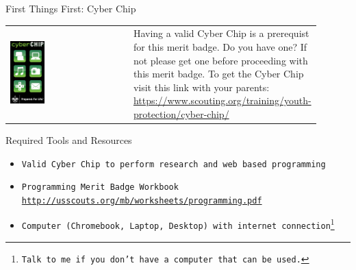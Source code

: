 \documentclass[10pt]{beamer}
\begin{document}
{\begin{frame}{First Things First: Cyber Chip}{ }
\begin{tabular}{m{0.4\linewidth}m{0.5\linewidth}}  
\includegraphics[width=0.3\textwidth]{img/cyberchip.png} & \cellcolor[gray]{0.8} Having a valid Cyber Chip is a prerequist for this merit badge.  Do you have one?  If not please get one before proceeding with this merit badge.
To get the Cyber Chip visit this link with your parents: {\footnotesize \url{https://www.scouting.org/training/youth-protection/cyber-chip/}}
\end{tabular} 
\vspace{1cm}

\end{frame}


\begin{frame}{Required Tools and Resources}{}
\begin{block}{}
  \begin{itemize}
    \item {\tt Valid Cyber Chip to perform research and web based programming}
    \item {\tt Programming Merit Badge Workbook \url{http://usscouts.org/mb/worksheets/programming.pdf}}
    \item {\tt Computer (Chromebook, Laptop, Desktop) with internet connection\footnote{Talk to me if you don't have a computer that can be used.}}
    \vspace{2cm}
    \end{itemize}
	\end{block}
\end{frame}


}
\end{document}
